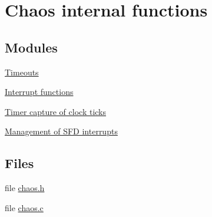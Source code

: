 \hypertarget{group__chaos__internal}{\section{Chaos internal functions}
\label{group__chaos__internal}
}
\subsection*{Modules}
\begin{DoxyCompactItemize}
\item 
\hyperlink{group__chaos__timeouts}{Timeouts}
\item 
\hyperlink{group__chaos__interrupts}{Interrupt functions}
\item 
\hyperlink{group__chaos__capture}{Timer capture of clock ticks}
\item 
\hyperlink{group__chaos__sfd}{Management of S\-F\-D interrupts}
\end{DoxyCompactItemize}
\subsection*{Files}
\begin{DoxyCompactItemize}
\item 
file \hyperlink{chaos_8h}{chaos.\-h}
\item 
file \hyperlink{chaos_8c}{chaos.\-c}
\end{DoxyCompactItemize}
